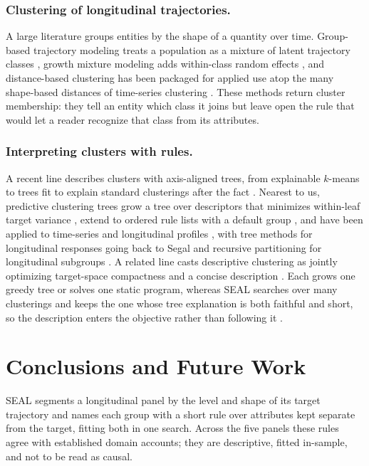 \documentclass[runningheads]{llncs}
\begin{document}
\subsubsection{Clustering of longitudinal trajectories.}
A large literature groups entities by the shape of a quantity over time. Group-based trajectory modeling treats a population as a mixture of latent trajectory classes \citep{nagin2005group,nagin2010group}, growth mixture modeling adds within-class random effects \citep{muthen1999finite}, and distance-based clustering has been packaged for applied use \citep{genolini2010kml,denteuling2023latrend} atop the many shape-based distances of time-series clustering \citep{berndt1994using,aghabozorgi2015timeseries}. These methods return cluster membership: they tell an entity which class it joins but leave open the rule that would let a reader recognize that class from its attributes.

\subsubsection{Interpreting clusters with rules.}
A recent line describes clusters with axis-aligned trees, from explainable $k$-means \citep{dasgupta2020explainable} to trees fit to explain standard clusterings after the fact \citep{hu2026interpretable}. Nearest to us, predictive clustering trees grow a tree over descriptors that minimizes within-leaf target variance \citep{blockeel1998clustering}, extend to ordered rule lists with a default group \citep{zenko2006predictive}, and have been applied to time-series and longitudinal profiles \citep{dzeroski2007timeseries,slavkov2010finding}, with tree methods for longitudinal responses going back to Segal \cite{segal1992tree} and recursive partitioning for longitudinal subgroups \citep{loh2013regression}. A related line casts descriptive clustering as jointly optimizing target-space compactness and a concise description \citep{dao2018descriptive}. Each grows one greedy tree or solves one static program, whereas \textsc{SEAL} searches over many clusterings and keeps the one whose tree explanation is both faithful and short, so the description enters the objective rather than following it \citep{rudin2019stop}.

\section{Conclusions and Future Work}

\textsc{SEAL} segments a longitudinal panel by the level and shape of its target trajectory and names each group with a short rule over attributes kept separate from the target, fitting both in one search. Across the five panels these rules agree with established domain accounts; they are descriptive, fitted in-sample, and not to be read as causal.
\end{document}
